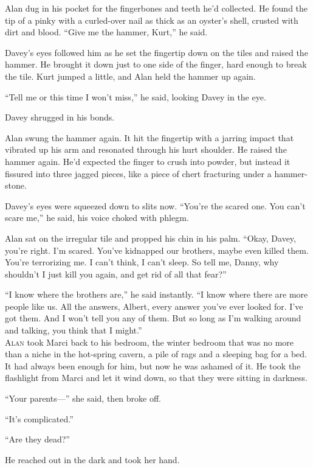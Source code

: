 \documentclass{article}
\begin{document}
Alan dug in his pocket for the fingerbones and teeth he'd collected. 
He found the tip of a pinky with a curled-over nail as thick as an
oyster's shell, crusted with dirt and blood.  ``Give me the hammer,
Kurt,'' he said.

Davey's eyes followed him as he set the fingertip down on the tiles
and raised the hammer.  He brought it down just to one side of the
finger, hard enough to break the tile.  Kurt jumped a little, and Alan
held the hammer up again.

``Tell me or this time I won't miss,'' he said, looking Davey in the
eye.

Davey shrugged in his bonds.

Alan swung the hammer again.  It hit the fingertip with a jarring
impact that vibrated up his arm and resonated through his hurt
shoulder.  He raised the hammer again.  He'd expected the finger to
crush into powder, but instead it fissured into three jagged pieces,
like a piece of chert fracturing under a hammer-stone.

Davey's eyes were squeezed down to slits now.  ``You're the scared
one.  You can't scare me,'' he said, his voice choked with phlegm.

Alan sat on the irregular tile and propped his chin in his palm. 
``Okay, Davey, you're right.  I'm scared.  You've kidnapped our
brothers, maybe even killed them.  You're terrorizing me.  I can't
think, I can't sleep.  So tell me, Danny, why shouldn't I just kill
you again, and get rid of all that fear?''

``I know where the brothers are,'' he said instantly.  ``I know where
there are more people like us.  All the answers, Albert, every answer
you've ever looked for.  I've got them.  And I won't tell you any of
them.  But so long as I'm walking around and talking, you think that I
might.''
\\
\lettrine[lines=3, lhang=.5, nindent=0pt, findent=2pt]{A}{lan} took Marci back to his bedroom, the winter bedroom that was no
more than a niche in the hot-spring cavern, a pile of rags and a
sleeping bag for a bed.  It had always been enough for him, but now he
was ashamed of it.  He took the flashlight from Marci and let it wind
down, so that they were sitting in darkness.

``Your parents---'' she said, then broke off.

``It's complicated.''

``Are they dead?''

He reached out in the dark and took her hand.
\end{document}
